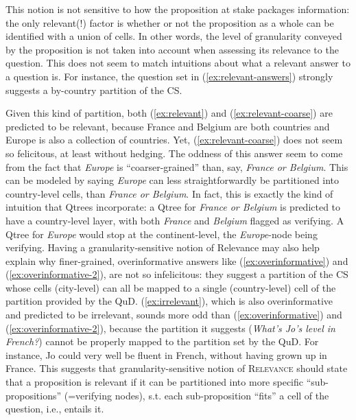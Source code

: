 This notion is not sensitive to how the proposition at stake packages information: the only relevant(!) factor is whether or not the proposition as a whole can be identified with a union of cells. In other words, the level of granularity conveyed by the proposition is not taken into account when assessing its relevance to the question. This does not seem to match intuitions about what a relevant answer to a question is. For instance, the question set in (\ref{ex:relevant-answers}) strongly suggests a by-country partition of the CS.
\begin{exe}
\begin{xlist}
	\label{ex:relevant}
	\label{ex:relevant-coarse}
	\label{ex:overinformative}
	\label{ex:overinformative-2}
	\label{ex:irrelevant}
\end{xlist}
\label{ex:relevant-answers}
\end{exe}

Given this kind of partition, both (\ref{ex:relevant}) and (\ref{ex:relevant-coarse}) are predicted to be relevant, because France and Belgium are both countries and Europe is also a collection of countries. Yet, (\ref{ex:relevant-coarse}) does not seem so felicitous, at least without hedging. The oddness of this answer seem to come from the fact that \textit{Europe} is ``coarser-grained'' than, say, \textit{France or Belgium}. This can be modeled by saying \textit{Europe} can less straightforwardly be partitioned into country-level cells, than \textit{France or Belgium}. In fact, this is exactly the kind of intuition that Qtrees incorporate: a Qtree for \textit{France or Belgium} is predicted to have a country-level layer, with both \textit{France} and \textit{Belgium} flagged as verifying. A Qtree for \textit{Europe} would stop at the continent-level, the \textit{Europe}-node being verifying. Having a granularity-sensitive notion of Relevance may also help explain why finer-grained, overinformative answers like (\ref{ex:overinformative}) and (\ref{ex:overinformative-2}), are not so infelicitous: they suggest a partition of the CS whose cells (city-level) can all be mapped to a single (country-level) cell of the partition provided by the QuD. (\ref{ex:irrelevant}), which is also overinformative and predicted to be irrelevant, sounds more odd than (\ref{ex:overinformative}) and (\ref{ex:overinformative-2}), because the partition it suggests (\textit{What's Jo's level in French?}) cannot be properly mapped to the partition set by the QuD. For instance, Jo could very well be fluent in French, without having grown up in France. This suggests that granularity-sensitive notion of \textsc{Relevance} should state that a proposition is relevant if it can be partitioned into more specific ``sub-propositions'' (=verifying nodes), s.t. each sub-proposition ``fits'' a cell of the question, i.e., entails it.


